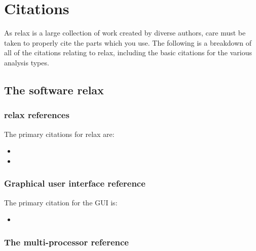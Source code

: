 
\chapter{Citations} \label{ch: citations}

As relax is a large collection of work created by diverse authors, care must be taken to properly cite the parts which you use.  The following is a breakdown of all of the citations relating to relax, including the basic citations for the various analysis types.




\section{The software relax}



\subsection{relax references}

The primary citations for relax are:

\begin{itemize}
\item {}
\item {}
\end{itemize}



\subsection{Graphical user interface reference}

The primary citation for the GUI is:

\begin{itemize}
\item {}
\end{itemize}



\subsection{The multi-processor reference}

